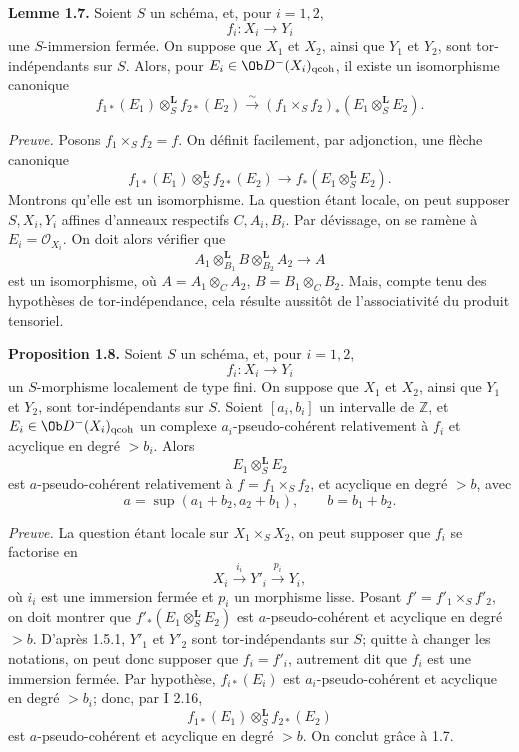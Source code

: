 \documentclass[11pt]{article}
\begin{document}
\textbf{Lemme 1.7.} Soient \(S\) un schéma, et, pour \(i=1,2\),
\[
  f_i:X_i\longrightarrow Y_i
\]
une \(S\)-immersion fermée. On suppose que \(X_1\) et \(X_2\), ainsi que \(Y_1\) et \(Y_2\), sont tor-indépendants sur \(S\). Alors, pour \(E_i\in\Ob D^{-}(X_i)_{\mathrm{qcoh}}\), il existe un isomorphisme canonique
\[
  f_{1*}(E_1)\otimes_S^{\mathbf L}f_{2*}(E_2)
  \xrightarrow{\sim}
  (f_1\times_Sf_2)_*(E_1\otimes_S^{\mathbf L}E_2).
\]

\emph{Preuve.} Posons \(f_1\times_Sf_2=f\). On définit facilement, par adjonction, une flèche canonique
\[
  f_{1*}(E_1)\otimes_S^{\mathbf L}f_{2*}(E_2)
  \longrightarrow
  f_*(E_1\otimes_S^{\mathbf L}E_2).
\]
Montrons qu'elle est un isomorphisme. La question étant locale, on peut supposer \(S,X_i,Y_i\) affines d'anneaux respectifs \(C,A_i,B_i\). Par dévissage, on se ramène à \(E_i=\mathcal O_{X_i}\). On doit alors vérifier que
\[
  A_1\otimes_{B_1}^{\mathbf L}B\otimes_{B_2}^{\mathbf L}A_2
  \longrightarrow A
\]
est un isomorphisme, où \(A=A_1\otimes_C A_2\), \(B=B_1\otimes_C B_2\). Mais, compte tenu des hypothèses de tor-indépendance, cela résulte aussitôt de l'associativité du produit tensoriel.

\textbf{Proposition 1.8.} Soient \(S\) un schéma, et, pour \(i=1,2\),
\[
  f_i:X_i\longrightarrow Y_i
\]
un \(S\)-morphisme localement de type fini. On suppose que \(X_1\) et \(X_2\), ainsi que \(Y_1\) et \(Y_2\), sont tor-indépendants sur \(S\). Soient \([a_i,b_i]\) un intervalle de \(\mathbb Z\), et \(E_i\in\Ob D^{-}(X_i)_{\mathrm{qcoh}}\) un complexe \(a_i\)-pseudo-cohérent relativement à \(f_i\) et acyclique en degré \(>b_i\). Alors
\[
  E_1\otimes_S^{\mathbf L}E_2
\]
est \(a\)-pseudo-cohérent relativement à \(f=f_1\times_Sf_2\), et acyclique en degré \(>b\), avec
\[
  a=\sup(a_1+b_2,a_2+b_1),\qquad b=b_1+b_2.
\]

\emph{Preuve.} La question étant locale sur \(X_1\times_SX_2\), on peut supposer que \(f_i\) se factorise en
\[
  X_i\xrightarrow{i_i}Y'_i\xrightarrow{p_i}Y_i,
\]
où \(i_i\) est une immersion fermée et \(p_i\) un morphisme lisse. Posant \(f'=f'_1\times_Sf'_2\), on doit montrer que \(f'_*(E_1\otimes_S^{\mathbf L}E_2)\) est \(a\)-pseudo-cohérent et acyclique en degré \(>b\). D'après 1.5.1, \(Y'_1\) et \(Y'_2\) sont tor-indépendants sur \(S\); quitte à changer les notations, on peut donc supposer que \(f_i=f'_i\), autrement dit que \(f_i\) est une immersion fermée. Par hypothèse, \(f_{i*}(E_i)\) est \(a_i\)-pseudo-cohérent et acyclique en degré \(>b_i\); donc, par I 2.16,
\[
  f_{1*}(E_1)\otimes_S^{\mathbf L}f_{2*}(E_2)
\]
est \(a\)-pseudo-cohérent et acyclique en degré \(>b\). On conclut grâce à 1.7.
\end{document}
